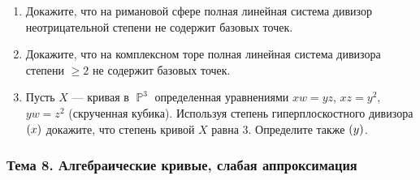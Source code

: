 \documentclass[a4paper, 12pt]{article}
\DeclareMathOperator{\PP}{\mathbb{P}}
\let\div\relax
\DeclareMathOperator{\div}{div}
\begin{document}
\begin{enumerate}[noitemsep,topsep=0pt]
    \item Докажите, что на римановой сфере полная линейная система дивизор неотрицательной степени не содержит базовых точек. %
    \item Докажите, что на комплексном торе полная линейная система дивизора степени $\geqslant 2$ не содержит базовых точек. %
    \item Пусть $X$ --- кривая в $\PP^3$ определенная уравнениями $xw=yz$, $xz=y^2$, $yw=z^2$ (скрученная кубика). Используя степень гиперплоскостного дивизора $\div(x)$ докажите, что степень кривой $X$ равна $3$. Определите также $\div (y)$. %
\end{enumerate}

\subsubsection{Тема 8. Алгебраические кривые, слабая аппроксимация}
\end{document}
